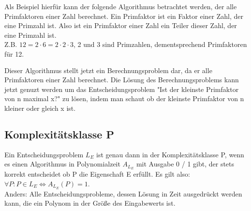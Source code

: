 \documentclass[
../../AuD-Zusammenfassung.tex,
]
{subfiles}
\begin{document}
Als Beispiel hierfür kann der folgende Algorithmus betrachtet werden, der alle Primfaktoren einer Zahl berechnet. Ein Primfaktor ist ein Faktor einer Zahl, der eine Primzahl ist. Also ist ein Primfaktor einer Zahl ein Teiler dieser Zahl, der eine Primzahl ist.\\
Z.B. $12 = 2 \cdot 6 = 2 \cdot 2 \cdot 3$, 2 und 3 sind Primzahlen, dementsprechend Primfaktoren für 12. \\
\begin{algorithm}[H]



\end{algorithm}
Dieser Algorithmus stellt jetzt ein Berechnungsproblem dar, da er alle Primfaktoren einer Zahl berechnet. Die Lösung des Berechnungsproblems kann jetzt genuzt werden um das Entscheidungsproblem "Ist der kleinste Primfaktor von n maximal x?" zu lösen, indem man schaut ob der kleinste Primfaktor von n kleiner oder gleich x ist.\\

\subsection{Komplexitätsklasse P}
Ein Entscheidungsproblem $L_E$ ist genau dann in der Komplexitätsklasse P, wenn es einen Algorithmus in Polynomialzeit $A_{L_E}$ mit Ausgabe 0 / 1 gibt, der stets korrekt entscheidet ob P die Eigenschaft E erfüllt. Es gilt also: $\forall P: P \in L_E \Leftrightarrow A_{L_E}(P) = 1$.\\
Anders: Alle Entscheidungsprobleme, dessen Lösung in Zeit ausgedrückt werden kann, die ein Polynom in der Größe des Eingabewerts ist.
\end{document}
